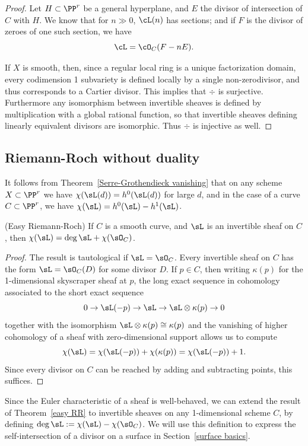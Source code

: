 \begin{proof}
Let $H \subset \PP^r$ be a general hyperplane, and $E$  the divisor  of intersection of $C$ with $H$. We know that for $n \gg 0$, $\cL(n)$ has sections; and if $F$ is the divisor of zeroes of one such section, we have
$$
\cL = \cO_C(F - nE).
$$

If $X$ is smooth, then, since a regular local ring is a unique factorization domain, every codimension 1 subvariety is defined locally
by a single non-zerodivisor, and thus corresponds to a Cartier divisor. This implies that $\div$ is surjective. Furthermore any isomorphism between invertible sheaves 
is defined by multiplication with a global rational function, so that invertible sheaves defining linearly equivalent divisors are
isomorphic. Thus $\div$ is injective as well.
\end{proof}

\subsection{Riemann-Roch without duality}

It follows from Theorem~\ref{Serre-Grothendieck vanishing} that on any scheme $X\subset \PP^r$ we have $\chi(\sL(d)) = h^0(\sL(d))$ for large $d$, and in the case of a curve $C\subset \PP^r$, we have $\chi(\sL) = h^0(\sL) - h^1(\sL)$. 

\begin{theorem} (Easy Riemann-Roch)\label{easy RR}
If $C$ is a smooth curve, and $\sL$ is an invertible sheaf on $C$, then $\chi(\sL) = \deg \sL + \chi(\sO_C)$.
\end{theorem}

\begin{proof}
 The result is tautological if $\sL = \sO_C$. Every invertible sheaf on $C$ has the form $\sL = \sO_C(D)$ for some
divisor $D$. If $p\in C$, then writing $\kappa(p)$ for the 1-dimensional skyscraper sheaf at $p$, the long exact sequence in cohomology
associated to the short exact sequence
$$
0\to \sL(-p) \to \sL \to \sL\otimes \kappa(p)\to 0
$$
together with the isomorphism $\sL\otimes \kappa(p) \cong \kappa(p)$
and the vanishing of higher cohomology of a sheaf with zero-dimensional support allows us to compute 
$$
\chi(\sL) = \chi(\sL(-p)) + \chi(\kappa(p)) = \chi(\sL(-p)) + 1.
$$
Since every divisor on $C$ can be reached by adding and subtracting points, this suffices.
\end{proof}

Since the Euler characteristic of a sheaf is well-behaved, we can extend the result of Theorem~\ref{easy RR} 
to invertible sheaves on any 1-dimensional scheme $C$, by defining $\deg \sL := \chi(\sL) -\chi(\sO_C)$.
We will use this definition to express the self-intersection of a divisor on a surface in Section~\ref{surface basics}.

